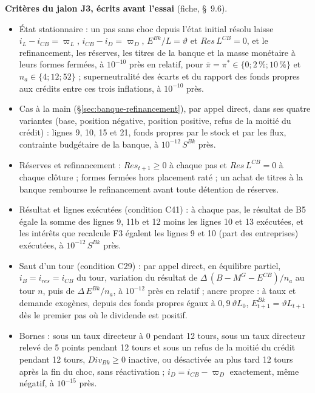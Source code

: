 \documentclass[11pt,a4paper]{article}
\begin{document}
\begin{proposee}
\textbf{Critères du jalon J3, écrits avant l'essai} (fiche, \S~9.6).
\begin{itemize}
\item État stationnaire : un pas sans choc depuis l'état initial résolu laisse $i_L - i_{\mathit{CB}} = \varpi_L$, $i_{\mathit{CB}} - i_D = \varpi_D$, $E^{\mathit{Bk}}/L = \vartheta$ et $\mathit{Res}\,L^{\mathit{CB}} = 0$, et le refinancement, les réserves, les titres de la banque et la masse monétaire à leurs formes fermées, à $10^{-10}$ près en relatif, pour $\bar\pi = \pi^\ast \in \{0 ; 2\,\% ; 10\,\%\}$ et $n_a \in \{4 ; 12 ; 52\}$ ; superneutralité des écarts et du rapport des fonds propres aux crédits entre ces trois inflations, à $10^{-10}$ près.
\item Cas à la main (\S\ref{sec:banque-refinancement}), par appel direct, dans ses quatre variantes (base, position négative, position positive, refus de la moitié du crédit) : lignes 9, 10, 15 et 21, fonds propres par le stock et par les flux, contrainte budgétaire de la banque, à $10^{-12}\,S^{\mathit{Bk}}$ près.
\item Réserves et refinancement : $\mathit{Res}_{t+1} \ge 0$ à chaque pas et $\mathit{Res}\,L^{\mathit{CB}} = 0$ à chaque clôture ; formes fermées hors placement raté ; un achat de titres à la banque rembourse le refinancement avant toute détention de réserves.
\item Résultat et lignes exécutées (condition C41) : à chaque pas, le résultat de B5 égale la somme des lignes 9, 11b et 12 moins les lignes 10 et 13 exécutées, et les intérêts que recalcule F3 égalent les lignes 9 et 10 (part des entreprises) exécutées, à $10^{-12}\,S^{\mathit{Bk}}$ près.
\item Saut d'un tour (condition C29) : par appel direct, en équilibre partiel, $i_B = i_{\mathit{res}} = i_{\mathit{CB}}$ du tour, variation du résultat de $\Delta\,(B - M^G - E^{\mathit{CB}})/n_a$ au tour $n$, puis de $\Delta\,E^{\mathit{Bk}}/n_a$, à $10^{-12}$ près en relatif ; ancre propre : à taux et demande exogènes, depuis des fonds propres égaux à $0{,}9\,\vartheta L_0$, $E^{\mathit{Bk}}_{t+1} = \vartheta L_{t+1}$ dès le premier pas où le dividende est positif.
\item Bornes : sous un taux directeur à 0 pendant 12 tours, sous un taux directeur relevé de 5 points pendant 12 tours et sous un refus de la moitié du crédit pendant 12 tours, $\mathit{Div}_{\mathit{Bk}} \ge 0$ inactive, ou désactivée au plus tard 12 tours après la fin du choc, sans réactivation ; $i_D = i_{\mathit{CB}} - \varpi_D$ exactement, même négatif, à $10^{-15}$ près.

\end{itemize}
\end{proposee}
\end{document}
